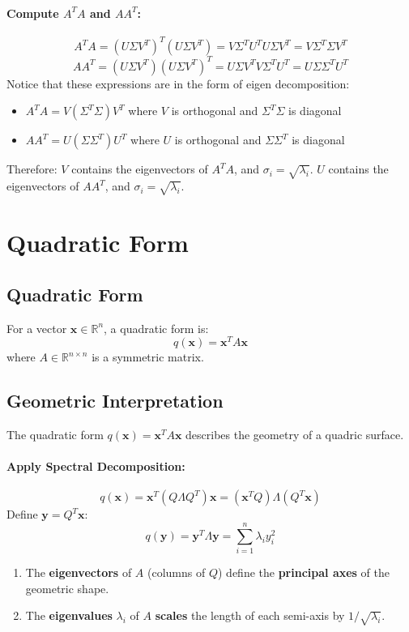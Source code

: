 \documentclass{article}
\begin{document}
\paragraph{Compute $A^T A$ and $AA^T$:}
\[
    A^T A = (U \Sigma V^T)^T (U \Sigma V^T) = V \Sigma^T U^T U \Sigma V^T = V \Sigma^T \Sigma V^T
\]
\[
    AA^T = (U \Sigma V^T)(U \Sigma V^T)^T = U \Sigma V^T V \Sigma^T U^T = U \Sigma \Sigma^T U^T
\]
Notice that these expressions are in the form of eigen decomposition:
\begin{itemize}
    \item $A^T A = V (\Sigma^T \Sigma) V^T$ where $V$ is orthogonal and $\Sigma^T \Sigma$ is diagonal
    \item $AA^T = U (\Sigma \Sigma^T) U^T$ where $U$ is orthogonal and $\Sigma \Sigma^T$ is diagonal
\end{itemize}
Therefore: $V$ contains the eigenvectors of $A^T A$, and $\sigma_i = \sqrt{\lambda_i}$. $U$ contains the eigenvectors of $AA^T$, and $\sigma_i = \sqrt{\lambda_i}$.


\newpage
\section{Quadratic Form}

\subsection{Quadratic Form}
For a vector $\mathbf{x} \in \mathbb{R}^n$, a quadratic form is:
\[
    q(\mathbf{x}) = \mathbf{x}^T A \mathbf{x}
\]
where $A \in \mathbb{R}^{n \times n}$ is a symmetric matrix.

\subsection{Geometric Interpretation}
The quadratic form $q(\mathbf{x}) = \mathbf{x}^T A \mathbf{x}$ describes the geometry of a quadric surface.

\paragraph{Apply Spectral Decomposition:}
\[
    q(\mathbf{x}) = \mathbf{x}^T (Q \Lambda Q^T) \mathbf{x} = (\mathbf{x}^T Q) \Lambda (Q^T \mathbf{x})
\]
Define $\mathbf{y} = Q^T \mathbf{x}$:
\[
    q(\mathbf{y}) = \mathbf{y}^T \Lambda \mathbf{y} = \sum_{i=1}^n \lambda_i y_i^2
\]
\begin{enumerate}
    \item The \textbf{eigenvectors} of $A$ (columns of $Q$) define the \textbf{principal axes} of the geometric shape.
    \item The \textbf{eigenvalues} $\lambda_i$ of $A$ \textbf{scales} the length of each semi-axis by $1/\sqrt{\lambda_i}$.
\end{enumerate}
\end{document}

